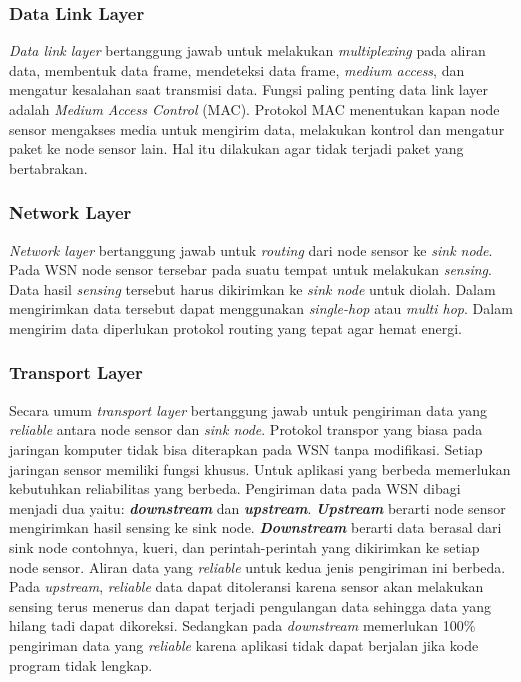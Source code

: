 \subsubsection{Data Link Layer}
\textit{Data link layer} bertanggung jawab untuk melakukan \textit{multiplexing} pada aliran data, membentuk data frame, mendeteksi data frame, \textit{medium access}, dan mengatur kesalahan saat transmisi data. Fungsi paling penting data link layer adalah \textit{Medium Access Control} (MAC). Protokol MAC menentukan kapan node sensor mengakses media untuk mengirim data, melakukan kontrol dan mengatur paket ke node sensor lain. Hal itu dilakukan agar tidak terjadi paket yang bertabrakan. 

\subsubsection{Network Layer}
\textit{Network layer} bertanggung jawab untuk \textit{routing} dari node sensor ke \textit{sink node}. Pada WSN node sensor tersebar pada suatu tempat untuk melakukan \textit{sensing}. Data hasil \textit{sensing} tersebut harus dikirimkan ke \textit{sink node} untuk diolah. Dalam mengirimkan data tersebut dapat menggunakan \textit{single-hop} atau \textit{multi hop}. Dalam mengirim data diperlukan protokol routing yang tepat agar hemat energi.

\subsubsection{Transport Layer}
Secara umum \textit{transport layer} bertanggung jawab untuk pengiriman data yang \textit{reliable} antara node sensor dan \textit{sink node}. Protokol transpor yang biasa pada jaringan komputer tidak bisa diterapkan pada WSN tanpa modifikasi. Setiap jaringan sensor memiliki fungsi khusus. Untuk aplikasi yang berbeda memerlukan kebutuhkan reliabilitas yang berbeda. Pengiriman data pada WSN dibagi menjadi dua yaitu: \textbf{\textit{downstream}} dan \textbf{\textit{upstream}}. \textbf{\textit{Upstream}} berarti node sensor mengirimkan hasil sensing ke sink node. \textbf{\textit{Downstream}} berarti data berasal dari sink node contohnya, kueri, dan perintah-perintah yang dikirimkan ke setiap node sensor. Aliran data yang \textit{reliable} untuk kedua jenis pengiriman ini berbeda. Pada \textit{upstream}, \textit{reliable} data dapat ditoleransi karena sensor akan melakukan sensing terus menerus dan dapat terjadi pengulangan data sehingga data yang hilang tadi dapat dikoreksi. Sedangkan pada \textit{downstream} memerlukan 100\% pengiriman data yang \textit{reliable} karena aplikasi tidak dapat berjalan jika kode program tidak lengkap. 

